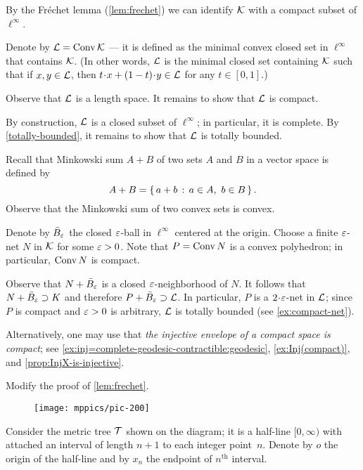 \setcounter{eqtn}{0}

By the Fréchet lemma (\ref{lem:frechet}) we can identify $\mathcal{K}$ with a compact subset of $\ell^\infty$.

Denote by $\mathcal{L}=\mathop{\rm Conv}\nolimits\mathcal{K}$ --- it is defined as the minimal convex closed set in $\ell^\infty$ that contains $\mathcal{K}$.
(In other words, $\mathcal{L}$ is the minimal closed set containing $\mathcal{K}$ such that if $x,y\in \mathcal{L}$, then 
$t\cdot x+(1-t)\cdot y\in \spc{L}$ for any $t\in[0,1]$.)

Observe that $\mathcal{L}$ is a length space.
It remains to show that $\mathcal{L}$ is compact.

By construction, $\mathcal{L}$ is a closed subset of $\ell^\infty$; in particular, it is complete.
By \ref{totally-bounded}, it remains to show that $\mathcal{L}$ is totally bounded.

Recall that Minkowski sum $A + B$ of two sets $A$ and $B$ in a vector space is defined by
\[A + B = \left\{\,{a+b}\,:\,{a\in A,\ b\in B}\,\right\}.\]
Observe that the Minkowski sum of two convex sets is convex.

Denote by $\bar B_\varepsilon$ the closed $\varepsilon$-ball in $\ell^\infty$ centered at the origin.
Choose a finite $\varepsilon$-net $N$ in $\mathcal{K}$ for some $\varepsilon>0$.
Note that $P=\mathop{\rm Conv}\nolimits N$ is a convex polyhedron; in particular, $\mathop{\rm Conv}\nolimits N$ is compact.

Observe that $N+\bar B_\varepsilon$ is a closed $\varepsilon$-neighborhood of $N$.
It follows that $N+\bar B_\varepsilon\supset K$ and therefore $P+\bar B_\varepsilon\supset \mathcal{L}$.
In particular, $P$ is a $2\cdot\eps$-net in $\mathcal{L}$;
since $P$ is compact and $\varepsilon>0$ is arbitrary, $\mathcal{L}$ is totally bounded (see \ref{ex:compact-net}).

Alternatively, one may use that \textit{the injective envelope of a compact space is compact}; see \ref{ex:inj=complete-geodesic-contractible:geodesic}, \ref{ex:Inj(compact)}, and \ref{prop:InjX-is-injective}.

Modify the proof of \ref{lem:frechet}.

\begin{wrapfigure}{r}{23mm}
\vskip-6mm
\centering
\texttt{[image: mppics/pic-200]}
\end{wrapfigure}

Consider the metric tree $\mathcal{T}$ shown on the diagram;
it is a half-line $[0,\infty)$ with attached an interval of length $n+1$ to each integer point~$n$.
Denote by $o$ the origin of the half-line
and by $x_n$ the endpoint of $n^{\text{th}}$ interval.

